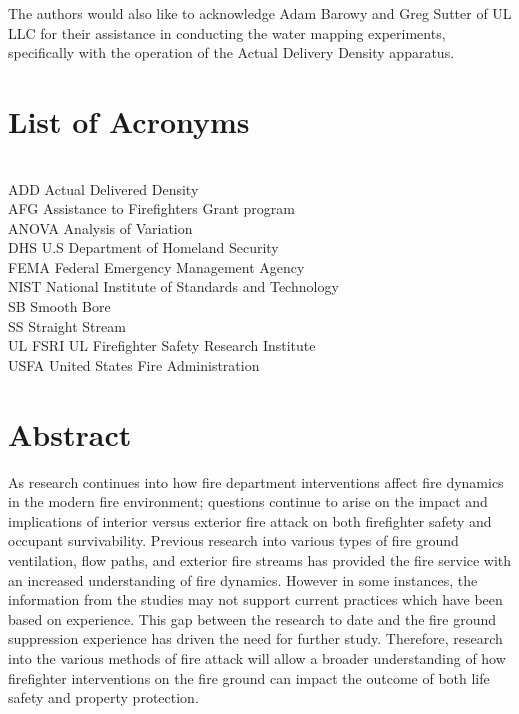 \documentclass[12pt,oneside]{book}
\begin{document}
The authors would also like to acknowledge Adam Barowy and Greg Sutter of UL LLC for their assistance in conducting the water mapping experiments, specifically with the operation of the Actual Delivery Density apparatus.

\cleardoublepage
{}
{}
\tableofcontents

\cleardoublepage
{}
{}
\listoffigures

\cleardoublepage
{}
{}
\listoftables

\chapter{List of Acronyms}

\begin{tabbing}
\hspace{1.5in} \= \\
ADD \> Actual Delivered Density \\
AFG \> Assistance to Firefighters Grant program  \\
ANOVA \> Analysis of Variation \\
DHS \> U.S Department of Homeland Security   \\   
FEMA \> Federal Emergency Management Agency  \\
NIST \> National Institute of Standards and Technology \\
SB \> Smooth Bore \\
SS \> Straight Stream \\
UL FSRI \> UL Firefighter Safety Research Institute \\
USFA \> United States Fire Administration  \\
\end{tabbing}

\newpage

\mainmatter

\chapter*{\centering Abstract}

As research continues into how fire department interventions affect fire dynamics in the modern fire environment; questions continue to arise on the impact and implications of interior versus exterior fire attack on both firefighter safety and occupant survivability. Previous research into various types of fire ground ventilation, flow paths, and exterior fire streams has provided the fire service with an increased understanding of fire dynamics. However in some instances, the information from the studies may not support current practices which have been based on experience. This gap between the research to date and the fire ground suppression experience has driven the need for further study. Therefore, research into the various methods of fire attack will allow a broader understanding of how firefighter interventions on the fire ground can impact the outcome of both life safety and property protection. 
\end{document}
